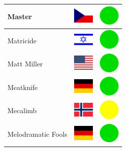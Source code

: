 \documentclass[12pt, a4paper, twoside]{report}
\begin{document}
\begin{center}
\begin{longtable}{|p{5cm}|p{2cm}|p{2cm}|}
Master & \includegraphics[width=1cm]{4x3/cz} & \includegraphics[width=1cm]{likes/y} \\ \hline
Matricide & \includegraphics[width=1cm]{4x3/il} & \includegraphics[width=1cm]{likes/y} \\ \hline
Matt Miller & \includegraphics[width=1cm]{4x3/us} & \includegraphics[width=1cm]{likes/y} \\ \hline
Meatknife & \includegraphics[width=1cm]{4x3/de} & \includegraphics[width=1cm]{likes/y} \\ \hline
Mecalimb & \includegraphics[width=1cm]{4x3/no} & \includegraphics[width=1cm]{likes/m} \\ \hline
Melodramatic Fools & \includegraphics[width=1cm]{4x3/de} & \includegraphics[width=1cm]{likes/y} \\ \hline

\end{longtable}
\end{center}
\end{document}
